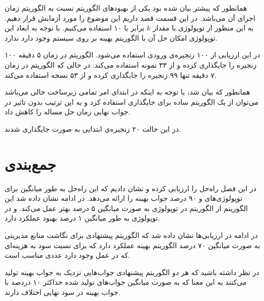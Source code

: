همانطور که پیشتر بیان شده بود یکی از بهبودهای الگوریتم  نسبت به
الگوریتم 
زمان اجرای آن می‌باشد.
در این قسمت قصد داریم این موضوع را مورد آزمایش قرار دهیم.
به این منظور از توپولوژی  با مقدار \(k\) برابر با ۱۰ استفاده می‌کنیم.
با توجه به ابعاد این توپولوژی امکان حل آن با الگوریتم بهینه بر روی سیستم  وجود دارد ندارد.

در این ارزیابی از ۱۰۰ زنجیره‌ی ورودی استفاده می‌شود. الگوریتم 
در زمان ۵ دقیقه ۱۰۰ زنجیره را جایگذاری کرده و از ۳۳ نمونه
استفاده می‌کند. در حالی که الگوریتم 
در زمان ۷ دقیقه تنها ۹۹ زنجیره را جایگذاری کرده و از ۵۳ نسخه
استفاده می‌کند.

همانطور که بیان شد، با توجه به اینکه در ابتدای امر تمامی زیرساخت خالی می‌باشد
می‌توان از یک الگوریتم ساده برای جایگذاری استفاده کرد و به این ترتیب
بدون تاثیر در جواب نهایی زمان حل مساله را کاهش داد.

در این حالت ۲۰ زنجیره‌ی ابتدایی به صورت 
جایگذاری شدند.


\section{جمع‌بندی}
در این فصل راه‌حل  را ارزیابی کرده و نشان دادیم
که این راه‌حل به طور میانگین برای توپولوژی‌های  و 
۹۰ درصد جواب بهینه را ارائه می‌دهد.
در ادامه نشان داده شد این الگوریتم از الگوریتم 
در توپولوژی 
به صورت میانگین ۵ درصد بهتر عمل می‌کند.
و در توپولوژی 
به طور میانگین ۱ درصد بهبود عملکرد دارد.

در ادامه در ارزیابی‌ها نشان داده شد که الگوریتم پیشنهادی برای نگاشت منابع مدیریتی
به صورت میانگین ۷۰ درصد الگوریتم بهینه عملکرد دارد
که برای نسبت سود به هزینه‌ای که در عمل وجود دارد عددی مناسب است.

در نظر داشته باشید که هر دو الگوریتم پیشنهادی جواب‌هایی نزدیک به جواب بهینه تولید می‌کنند به این معنا
که به صورت میانگین جواب‌های تولید شده حداکثر ۱۰ دردصد با جواب بهینه در سود نهایی اختلاف دارند.